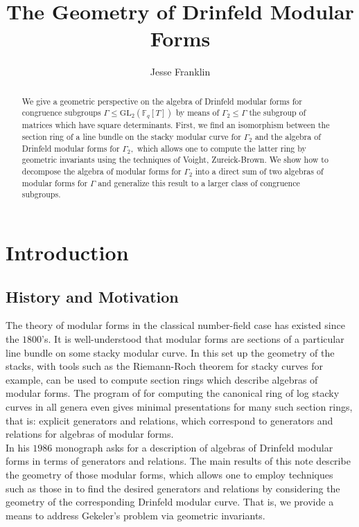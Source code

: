 \documentclass[11pt]{amsart}
\theoremstyle{definition}
\numberwithin{equation}{section}
\newcommand{\GL}{\mathrm{GL}} 	%
\newcommand{\bbF}{\mathbb{F}}		%
\begin{document}
	
\title{The Geometry of Drinfeld Modular Forms}
\author{Jesse Franklin}
\address{Department of Mathematics and Statistics, University of Vermont, Burlington VT 05405}
	
	\begin{abstract}
			We give a geometric perspective on the algebra of Drinfeld modular forms for congruence subgroups $\Gamma\leq \GL_2(\bbF_q[T])$ by means of $\Gamma_2\leq\Gamma$ the subgroup of matrices which have square determinants. First, we find an isomorphism between the section ring of a line bundle on the stacky modular curve for $\Gamma_2$ and the algebra of Drinfeld modular forms for $\Gamma_2,$ which allows one to compute the latter ring by geometric invariants using the techniques of Voight, Zureick-Brown. We show how to decompose the algebra of modular forms for $\Gamma_2$ into a direct sum of two algebras of modular forms for $\Gamma$ and generalize this result to a larger class of congruence subgroups. 
		\end{abstract}
		\maketitle
		\tableofcontents
		
		\section{Introduction}
		
		\subsection{History and Motivation}
		The theory of modular forms in the classical number-field case has existed since the $1800$'s. It is well-understood that modular forms are sections of a particular line bundle on some stacky modular curve. In this set up the geometry of the stacks, with tools such as the Riemann-Roch theorem for stacky curves for example, can be used to compute section rings which describe algebras of modular forms. The program of \cite{VZB} for computing the canonical ring of log stacky curves in all genera even gives minimal presentations for many such section rings, that is: explicit generators and relations, which correspond to generators and relations for algebras of modular forms.\\
		
		In his $1986$ monograph \cite[Page $\mathrm{XIII}$]{Gekeler-Curves} asks for a description of algebras of Drinfeld modular forms in terms of generators and relations. The main results of this note describe the geometry of those modular forms, which allows one to employ techniques such as those in \cite{VZB} to find the desired generators and relations by considering the geometry of the corresponding Drinfeld modular curve. That is, we provide a means to address Gekeler's problem via geometric invariants.\\
		
\end{document}
